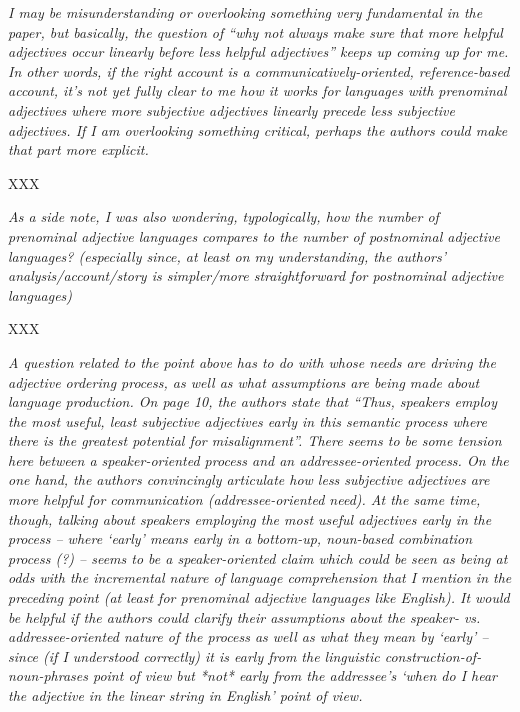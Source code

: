 \documentclass[12pt]{article}
\begin{document}
\emph{I may be misunderstanding or overlooking something very fundamental in the
paper, but basically, the question of ``why not always make sure that more
helpful adjectives occur linearly before less helpful adjectives'' keeps up
coming up for me. In other words, if the right account is a
communicatively-oriented, reference-based account, it's not yet fully
clear to me how it works for languages with prenominal adjectives where more
subjective adjectives linearly precede less subjective adjectives.  If I am
overlooking something critical, perhaps the authors could make that part
more explicit.}

XXX

\item \emph{As a side note, I was also wondering, typologically, how the number of
prenominal adjective languages compares to the number of postnominal
adjective languages?   (especially since, at least on my understanding, the
authors' analysis/account/story is simpler/more straightforward for
postnominal adjective languages)}

XXX

\item \emph{A question related to the point above has to do with whose needs are driving
the adjective ordering process, as well as what assumptions are being made
about language production. On page 10, the authors state that ``Thus,
speakers employ the most useful, least subjective adjectives early in this
semantic process where there is the greatest potential for misalignment''.
There seems to be some tension here between a speaker-oriented process and
an addressee-oriented process. On the one hand, the authors convincingly
articulate how less subjective adjectives are more helpful for communication
(addressee-oriented need). At the same time, though, talking about speakers
employing the most useful adjectives early in the process – where
`early' means early in a bottom-up, noun-based combination process (?)
– seems to be a speaker-oriented claim which could be seen as being at
odds with the incremental nature of language comprehension that I mention in
the preceding point (at least for prenominal adjective languages like
English).   It would be helpful if the authors could clarify their
assumptions about the speaker- vs. addressee-oriented nature of the process
as well as what they mean by `early'  – since (if I understood
correctly) it is early from the linguistic construction-of-noun-phrases
point of view but *not* early from the addressee's `when do I hear the
adjective in the linear string in English' point of view.}
\end{document}

